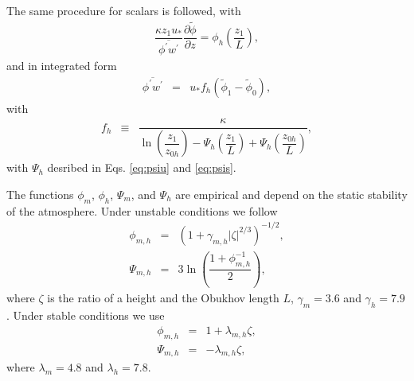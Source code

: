 \documentclass[gmd,manuscript]{copernicus}
\newcommand{\phif}{\ensuremath{\widetilde{\phi}}}
\begin{document}
The same procedure for scalars is followed, with
\begin{eqnarray}
\dfrac{\kappa z_1 u_*}{\overline{\phi^\prime w^\prime}} \dfrac{\partial \phif}{\partial z} =
\phi_h \left( \dfrac{z_1}{L} \right),
\end{eqnarray}
and in integrated form
\begin{eqnarray}
\overline{\phi^\prime w^\prime} & = & u_* f_h \left( \phif_1 - \phif_0 \right),
\end{eqnarray}
with
\begin{eqnarray}
f_h & \equiv &
\dfrac{\kappa}
{ \ln{\left( \dfrac{z_1}{z_{0h}} \right)}
	- \varPsi_h \left( \dfrac{z_1}{L} \right)
	+ \varPsi_h \left( \dfrac{z_{0h}}{L} \right) },
\end{eqnarray}
with $\varPsi_h$ desribed in Eqs. \ref{eq:psiu} and \ref{eq:psis}.

The functions $\phi_m$, $\phi_h$, $\varPsi_m$, and $\varPsi_h$ are empirical and depend on the static stability of the atmosphere. Under unstable conditions we follow \citep{Wilson2001, Wyngaard2010} 
\begin{eqnarray}
\phi_{m,h} & = & \left( 1 + \gamma_{m,h} \left| \zeta \right|^{2/3} \right)^{-1/2},\label{eq:phiu}\\
\varPsi_{m,h} & = & 3 \ln{\left( \dfrac{1 + \phi_{m,h}^{-1}}{2} \right)},\label{eq:psiu} 
\end{eqnarray}
where $\zeta$ is the ratio of a height and the Obukhov length $L$, $\gamma_m = 3.6$ and $\gamma_h = 7.9$. Under stable conditions we use \citep{Hogstrom1988, Wyngaard2010}
\begin{eqnarray}
\phi_{m,h} & = & 1 + \lambda_{m,h} \zeta, \label{eq:phis}\\
\varPsi_{m,h} & = & - \lambda_{m,h} \zeta, \label{eq:psis}
\end{eqnarray}
where $\lambda_m = 4.8$ and $\lambda_h = 7.8$.
\end{document}

